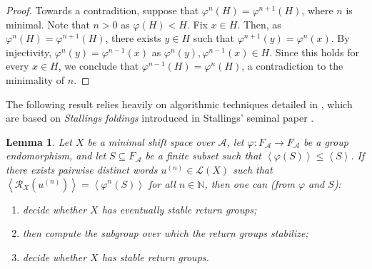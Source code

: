 \documentclass{amsart}
\newcommand*{\N}{\mathbb{N}}
\newcommand*{\ret}{\mathcal{R}}
\newcommand*{\lang}{\mathcal{L}}
\newcommand*{\cA}{\mathcal{A}}
\newcommand*{\from}{\colon}
\newcommand*{\gen}[1]{\left\langle #1\right\rangle}
\theoremstyle{plain}
\newtheorem{lemma}[theorem]{Lemma}
\theoremstyle{definition}
\theoremstyle{remark}
\begin{document}
\begin{proof}
    Towards a contradition, suppose that $\varphi^n(H) = \varphi^{n+1}(H)$, where $n$ is minimal. Note that $n>0$ as $\varphi(H) < H$. Fix $x\in H$. Then, as $\varphi^n(H)=\varphi^{n+1}(H)$, there exists $y\in H$ such that $\varphi^{n+1}(y) = \varphi^n(x)$. By injectivity, $\varphi^n(y) = \varphi^{n-1}(x)$ as $\varphi^n(y), \varphi^{n-1}(x) \in H$. Since this holds for every $x\in H$, we conclude that $\varphi^{n-1}(H) = \varphi^{n}(H)$, a contradiction to the minimality of $n$.
\end{proof}

The following result relies heavily on algorithmic techniques detailed in \cite{Kapovich2002}, which are based on \emph{Stallings foldings} introduced in Stallings' seminal paper \cite{Stallings1991}.

\begin{lemma}\label{L:decidability for pure morphic}
    Let $X$ be a minimal shift space over $\cA$, let $\varphi\from F_\cA \to F_\cA$ be a group endomorphism, and let $S \subseteq F_\cA$ be a finite subset such that $\gen{\varphi(S)} \leq \gen{S}$. 
    If there exists pairwise distinct words $u^{(n)}\in\lang(X)$ such that $\gen{\ret_X(u^{(n)})} = \gen{\varphi^{n}(S)}$ for all $n \in \N$,
    then one can (from $\varphi$ and $S$):
    \begin{enumerate}
        \item decide whether $X$ has eventually stable return groups;
        \item then compute the subgroup over which the return groups stabilize;
        \item decide whether $X$ has stable return groups.
    \end{enumerate}
\end{lemma}
\end{document}
